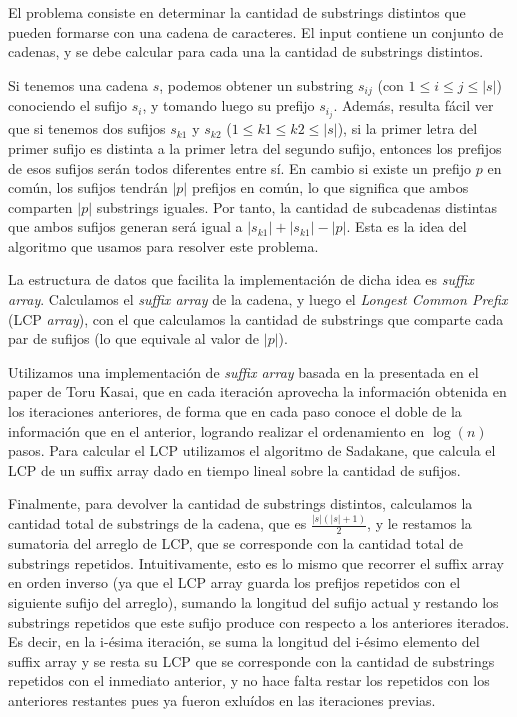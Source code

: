 El problema consiste en determinar la cantidad de substrings distintos que
pueden formarse con una cadena de caracteres. El input contiene un conjunto de
cadenas, y se debe calcular para cada una la cantidad de substrings distintos.

Si tenemos una cadena $s$, podemos obtener un substring $s_{ij}$ (con $1
\le i \le j \le |s|$) conociendo el sufijo $s_i$, y tomando luego su prefijo
$s_{i_j}$. Además, resulta fácil ver que si tenemos dos sufijos $s_{k1}$ y
$s_{k2}$ ($1 \le k1 \le k2 \le |s|$), si la primer letra del primer sufijo es
distinta a la primer letra del segundo sufijo, entonces los prefijos de esos
sufijos serán todos diferentes entre sí. En cambio si existe un prefijo $p$
en común, los sufijos tendrán $|p|$ prefijos en común, lo que significa
que ambos comparten $|p|$ substrings iguales. Por tanto, la cantidad de
subcadenas distintas que ambos sufijos generan será igual a $|s_{k1}| + |s_{k1}|
-|p|$. Esta es la idea del algoritmo que usamos para resolver este problema.

La estructura de datos que facilita la implementación de dicha idea es {\sl
suffix array}. Calculamos el {\sl suffix array} de la cadena, y luego el {\sl
Longest Common Prefix} (LCP {\sl array}), con el que calculamos la cantidad de
substrings que comparte cada par de sufijos (lo que equivale al valor de $|p|$).

Utilizamos una implementación de {\sl suffix array} basada en la presentada
en el paper de Toru Kasai\cite{kasai}, que en cada iteración aprovecha la
información obtenida en los iteraciones anteriores, de forma que en cada
paso conoce el doble de la información que en el anterior, logrando realizar
el ordenamiento en $\log(n)$ pasos. Para calcular el LCP utilizamos el
algoritmo de Sadakane, que calcula el LCP de un suffix array dado en tiempo
lineal sobre la cantidad de sufijos\cite{sadakane}.

Finalmente, para devolver la cantidad de substrings distintos,
calculamos la cantidad total de substrings de la cadena, que es
$\displaystyle\frac{|s|(|s|+1)}{2}$, y le restamos la sumatoria del arreglo
de LCP, que se corresponde con la cantidad total de substrings repetidos.
Intuitivamente, esto es lo mismo que recorrer el suffix array en orden inverso
(ya que el LCP array guarda los prefijos repetidos con el siguiente sufijo del
arreglo), sumando la longitud del sufijo actual y restando los substrings
repetidos que este sufijo produce con respecto a los anteriores iterados.
Es decir, en la i-ésima iteración, se suma la longitud del i-ésimo elemento
del suffix array y se resta su LCP que se corresponde con la cantidad de substrings
repetidos con el inmediato anterior, y no hace falta restar los repetidos con los
anteriores restantes pues ya fueron exluídos en las iteraciones previas.

